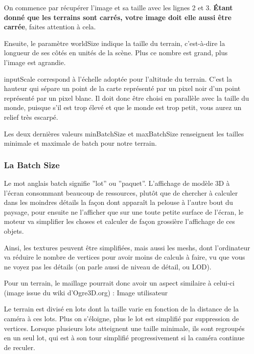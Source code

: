 \documentclass[10pt,a4paper]{report}
\begin{document}
On commence par r\'ecup\'erer l'image et sa taille avec les lignes 2 et 3. \textbf{\'Etant donn\'e que les terrains sont carr\'es, votre image doit elle aussi \^etre carr\'ee}, faites attention \`a cela.

Ensuite, le param\`etre worldSize indique la taille du terrain, c'est-\`a-dire la longueur de ses c\^ot\'es en unit\'es de la sc\`ene. Plus ce nombre est grand, plus l'image est agrandie.

inputScale correspond \`a l'\'echelle adopt\'ee pour l'altitude du terrain. C'est la hauteur qui s\'epare un point de la carte repr\'esent\'e par un pixel noir d'un point repr\'esent\'e par un pixel blanc. Il doit donc \^etre choisi en parall\`ele avec la taille du monde, puisque s'il est trop \'elev\'e et que le monde est trop petit, vous aurez un relief tr\`es escarp\'e.

Les deux derni\`eres valeurs minBatchSize  et maxBatchSize  renseignent les tailles minimale et maximale de batch pour notre terrain.



\subsubsection{La Batch Size}


Le mot anglais batch signifie ''lot'' ou ''paquet''. L'affichage de mod\`ele 3D \`a l'\'ecran consommant beaucoup de ressources, plut\^ot que de chercher \`a calculer dans les moindres d\'etails la fa\c{c}on dont appara\^it la pelouse \`a l'autre bout du paysage, pour ensuite ne l'afficher que sur une toute petite surface de l'\'ecran, le moteur va simplifier les choses et calculer de fa\c{c}on grossi\`ere l'affichage de ces objets.

Ainsi, les textures peuvent \^etre simplifi\'ees, mais aussi les meshs, dont l'ordinateur va r\'eduire le nombre de vertices pour avoir moins de calculs \`a faire, vu que vous ne voyez pas les d\'etails (on parle aussi de niveau de d\'etail, ou LOD).

Pour un terrain, le maillage pourrait donc avoir un aspect similaire \`a celui-ci (image issue du wiki d'Ogre3D.org) :
Image utilisateur

Le terrain est divis\'e en lots dont la taille varie en fonction de la distance de la cam\'era \`a ces lots. Plus on s'\'eloigne, plus le lot est simplifi\'e par suppression de vertices. Lorsque plusieurs lots atteignent une taille minimale, ils sont regroup\'es en un seul lot, qui est \`a son tour simplifi\'e progressivement si la cam\'era continue de reculer.
\end{document}
